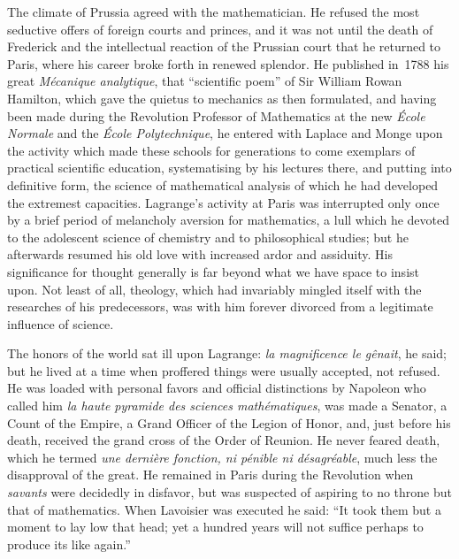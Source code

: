 \documentclass[12pt]{book}[2005/09/16]
\newcommand{\Typo}[2]{#2}
\newcommand{\PageSep}[1]{\ignorespaces}
\begin{document}
The climate of Prussia agreed with the mathematician. He
refused the most seductive offers of foreign courts and princes, and
it was not until the death of Frederick and the intellectual reaction
of the Prussian court that he returned to Paris, where his career
broke forth in renewed splendor. He published in~1788 his great
\textit{Mécanique analytique}, that ``scientific poem'' of Sir William
Rowan Hamilton, which gave the quietus to mechanics as then
formulated, and having been made during the Revolution Professor
of Mathematics at the new \textit{\Typo{Ecole}{École} Normale} and the \textit{\Typo{Ecole}{École} Polytechnique},
\index{Ecole@{\Typo{Ecole}{École} Normale}}%
%
he entered with Laplace and Monge upon the activity
%
%
\PageSep{xii}
which made these schools for generations to come exemplars of
practical scientific education, systematising by his lectures there,
and putting into definitive form, the science of mathematical analysis
of which he had developed the extremest capacities. Lagrange's
activity at Paris was interrupted only once by a brief period
of melancholy aversion for mathematics, a lull which he
devoted to the adolescent science of chemistry and to philosophical
studies; but he afterwards resumed his old love with increased ardor
and assiduity. His significance for thought generally is far
beyond what we have space to insist upon. Not least of all, theology,
which had invariably mingled itself with the researches of his
predecessors, was with him forever divorced from a legitimate influence
of science.

The honors of the world sat ill upon Lagrange: \textit{la magnificence
le gênait}, he said; but he lived at a time when proffered
things were usually accepted, not refused. He was loaded with
personal favors and official distinctions by Napoleon who called
%
him \textit{la haute pyramide des sciences mathématiques}, was made a
Senator, a Count of the Empire, a Grand Officer of the Legion of
Honor, and, just before his death, received the grand cross of the
Order of Reunion. He never feared death, which he termed \textit{une
dernière fonction, ni pénible ni désagréable}, much less the disapproval
of the great. He remained in Paris during the Revolution
when \textit{savants} were decidedly in disfavor, but was suspected
of aspiring to no throne but that of mathematics. When Lavoisier
%
was executed he said: ``It took them but a moment to lay low that
head; yet a hundred years will not suffice perhaps to produce its
like again.''
\end{document}
